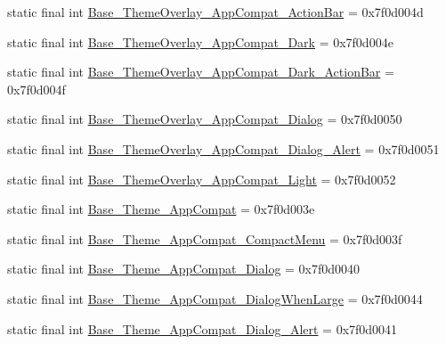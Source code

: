 \begin{DoxyCompactItemize}
\item 
static final int \mbox{\hyperlink{classcom_1_1synnapps_1_1carouselview_1_1_r_1_1style_a89257569e70fc77bfee645d744691277}{Base\+\_\+\+Theme\+Overlay\+\_\+\+App\+Compat\+\_\+\+Action\+Bar}} = 0x7f0d004d
\item 
static final int \mbox{\hyperlink{classcom_1_1synnapps_1_1carouselview_1_1_r_1_1style_a1fd75a13761639c24cf2d3607fce9abe}{Base\+\_\+\+Theme\+Overlay\+\_\+\+App\+Compat\+\_\+\+Dark}} = 0x7f0d004e
\item 
static final int \mbox{\hyperlink{classcom_1_1synnapps_1_1carouselview_1_1_r_1_1style_a9187d5c251df695d31bbc378f4afea28}{Base\+\_\+\+Theme\+Overlay\+\_\+\+App\+Compat\+\_\+\+Dark\+\_\+\+Action\+Bar}} = 0x7f0d004f
\item 
static final int \mbox{\hyperlink{classcom_1_1synnapps_1_1carouselview_1_1_r_1_1style_ad1a5e7f74907b5fc9344f31d7fd3659a}{Base\+\_\+\+Theme\+Overlay\+\_\+\+App\+Compat\+\_\+\+Dialog}} = 0x7f0d0050
\item 
static final int \mbox{\hyperlink{classcom_1_1synnapps_1_1carouselview_1_1_r_1_1style_a03063b66ff76791d449ab804d307bdb6}{Base\+\_\+\+Theme\+Overlay\+\_\+\+App\+Compat\+\_\+\+Dialog\+\_\+\+Alert}} = 0x7f0d0051
\item 
static final int \mbox{\hyperlink{classcom_1_1synnapps_1_1carouselview_1_1_r_1_1style_a5f41296da1fb8b4bfa90330e7e6dd3b4}{Base\+\_\+\+Theme\+Overlay\+\_\+\+App\+Compat\+\_\+\+Light}} = 0x7f0d0052
\item 
static final int \mbox{\hyperlink{classcom_1_1synnapps_1_1carouselview_1_1_r_1_1style_a62e96ef5c51405994a6c62aff50a877c}{Base\+\_\+\+Theme\+\_\+\+App\+Compat}} = 0x7f0d003e
\item 
static final int \mbox{\hyperlink{classcom_1_1synnapps_1_1carouselview_1_1_r_1_1style_a0688a001336565bbe7008f9612b6f6bf}{Base\+\_\+\+Theme\+\_\+\+App\+Compat\+\_\+\+Compact\+Menu}} = 0x7f0d003f
\item 
static final int \mbox{\hyperlink{classcom_1_1synnapps_1_1carouselview_1_1_r_1_1style_a8126f06114bb171e8ea461e15718f2be}{Base\+\_\+\+Theme\+\_\+\+App\+Compat\+\_\+\+Dialog}} = 0x7f0d0040
\item 
static final int \mbox{\hyperlink{classcom_1_1synnapps_1_1carouselview_1_1_r_1_1style_a8736d6412a7e011de2a2b864cc835124}{Base\+\_\+\+Theme\+\_\+\+App\+Compat\+\_\+\+Dialog\+When\+Large}} = 0x7f0d0044
\item 
static final int \mbox{\hyperlink{classcom_1_1synnapps_1_1carouselview_1_1_r_1_1style_a63fbc84311fa620b5b3feec011869ade}{Base\+\_\+\+Theme\+\_\+\+App\+Compat\+\_\+\+Dialog\+\_\+\+Alert}} = 0x7f0d0041

\end{DoxyCompactItemize}
